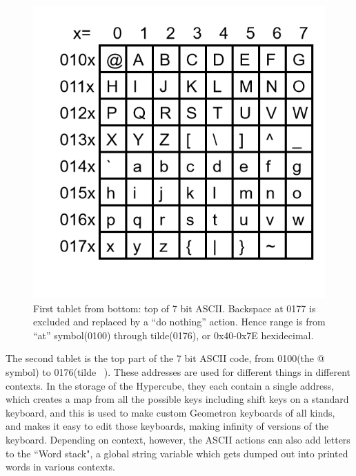 \documentclass[11pt]{article}
\begin{document}
\begin{figure}
\includegraphics{figures/figure4_asciitablet.png}
\caption{First tablet from bottom: top of 7 bit ASCII.  Backspace at 0177 is excluded and replaced by a ``do nothing'' action.  Hence range is from ``at'' symbol(0100) through tilde(0176), or 0x40-0x7E hexidecimal.}
\end{figure}

    The second tablet is the top part of the 7 bit ASCII code, from 0100(the @ symbol) to 0176(tilde ~).  These addresses are used for different things in different contexts. In the storage of the Hypercube, they each contain a single address, which creates a map from all the possible keys including shift keys on a standard keyboard, and this is used to make custom Geometron keyboards of all kinds, and makes it easy to edit those keyboards, making infinity of versions of the keyboard.  Depending on context, however, the ASCII actions can also add letters to the ``Word stack", a global string variable which gets dumped out into printed words in various contexts.
\end{document}
